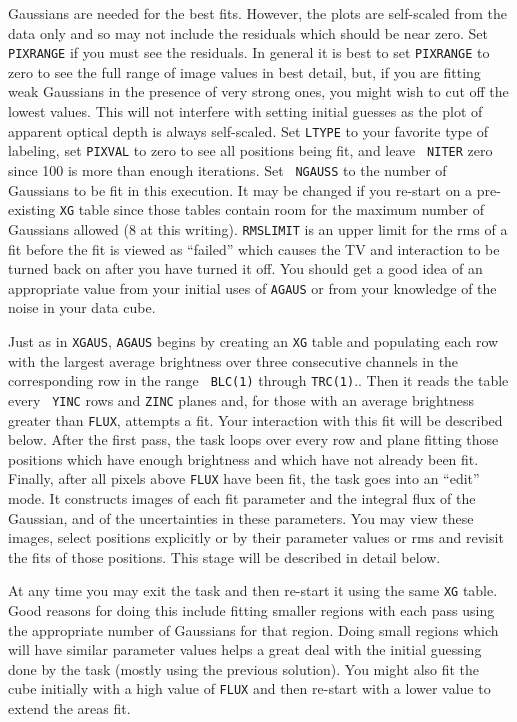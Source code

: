 \documentclass[twoside]{article}
\begin{document}
Gaussians are needed for the best fits.  However, the plots are
self-scaled from the data only and so may not include the residuals
which should be near zero.  Set {\tt PIXRANGE} if you must see the
residuals.  In general it is best to set {\tt PIXRANGE} to zero to see
the full range of image values in best detail, but, if you are fitting
weak Gaussians in the presence of very strong ones, you might wish to
cut off the lowest values.  This will not interfere with setting
initial guesses as the plot of apparent optical depth is always
self-scaled.  Set {\tt LTYPE} to your favorite type of labeling, set
{\tt PIXVAL} to zero to see all positions being fit, and leave {\tt
  NITER} zero since 100 is more than enough iterations. Set {\tt
  NGAUSS} to the number of Gaussians to be fit in this execution.  It
may be changed if you re-start on a pre-existing  {\tt XG} table since
those tables contain room for the maximum number of Gaussians allowed
(8 at this writing).  {\tt RMSLIMIT} is an upper limit for the rms of
a fit before the fit is viewed as ``failed'' which causes the TV and
interaction to be turned back on after you have turned it off.  You
should get a good idea of an appropriate value from your initial uses
of {\tt AGAUS} or from your knowledge of the noise in your data cube.

Just as in {\tt XGAUS}, {\tt AGAUS} begins by creating an {\tt XG}
table and populating each row with the largest average brightness over
three consecutive channels in the corresponding row in the range {\tt
  BLC(1)} through {\tt TRC(1)}\@..  Then it reads the table every {\tt
  YINC} rows and {\tt ZINC} planes and, for those with an average
brightness greater than {\tt FLUX}, attempts a fit.  Your interaction
with this fit will be described below.  After the first pass, the task
loops over every row and plane fitting those positions which have
enough brightness and which have not already been fit.  Finally, after
all pixels above {\tt FLUX} have been fit, the task goes into an
``edit'' mode.  It constructs images of each fit parameter and the
integral flux of the Gaussian, and of the uncertainties in these
parameters.  You may view these images, select positions explicitly or
by their parameter values or rms and revisit the fits of those
positions.  This stage will be described in detail below.

At any time you may exit the task and then re-start it using the
same {\tt XG} table.  Good reasons for doing this include fitting
smaller regions with each pass using the appropriate number of
Gaussians for that region.  Doing small regions which will have
similar parameter values helps a great deal with the initial guessing
done by the task (mostly using the previous solution).  You might also
fit the cube initially with a high value of {\tt FLUX} and then
re-start with a lower value to extend the areas fit.
\end{document}
